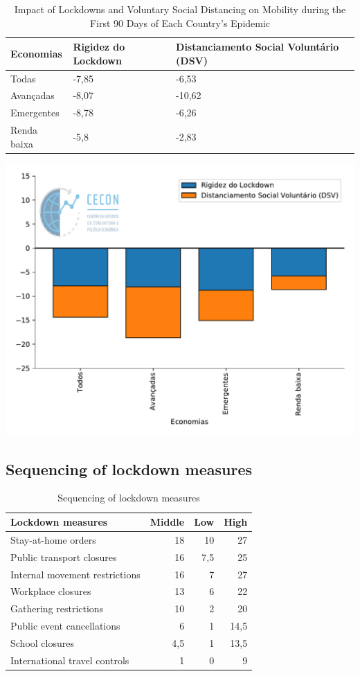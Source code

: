 \documentclass{SelfArx}
\begin{document}
\begin{table}[htbp]
\caption{\label{Vol_String}Impact of Lockdowns and Voluntary Social Distancing on Mobility during the First 90 Days of Each Country’s Epidemic}
\centering
\begin{tabular}{lll}
Economias & Rigidez do Lockdown & Distanciamento Social Voluntário (DSV)\\
\hline
Todas & -7,85 & -6,53\\
Avançadas & -8,07 & -10,62\\
Emergentes & -8,78 & -6,26\\
Renda baixa & -5,8 & -2,83\\
\hline
\end{tabular}
\end{table}

\begin{center}
\includegraphics[width=.9\linewidth]{./figs/IMF/Vol_String.pdf}
\end{center}

\subsection*{Sequencing of lockdown measures}
\label{sec:orga9c6536}
\begin{table}[htbp]
\caption{\label{Lock_measure}Sequencing of lockdown measures}
\centering
\begin{tabular}{lrrr}
\hline
Lockdown measures & Middle & Low & High\\
\hline
Stay-at-home orders & 18 & 10 & 27\\
Public transport closures & 16 & 7,5 & 25\\
Internal movement restrictions & 16 & 7 & 27\\
Workplace closures & 13 & 6 & 22\\
Gathering restrictions & 10 & 2 & 20\\
Public event cancellations & 6 & 1 & 14,5\\
School closures & 4,5 & 1 & 13,5\\
International travel controls & 1 & 0 & 9\\
\hline
\end{tabular}
\end{table}
\end{document}
